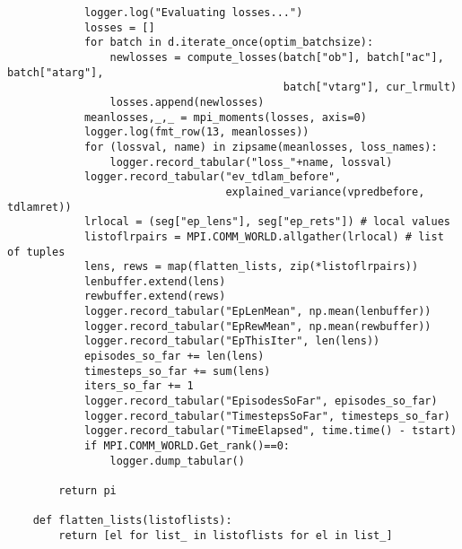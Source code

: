 \begin{verbatim}
            logger.log("Evaluating losses...")
            losses = []
            for batch in d.iterate_once(optim_batchsize):
                newlosses = compute_losses(batch["ob"], batch["ac"], batch["atarg"], 
                                           batch["vtarg"], cur_lrmult)
                losses.append(newlosses)
            meanlosses,_,_ = mpi_moments(losses, axis=0)
            logger.log(fmt_row(13, meanlosses))
            for (lossval, name) in zipsame(meanlosses, loss_names):
                logger.record_tabular("loss_"+name, lossval)
            logger.record_tabular("ev_tdlam_before", 
                                  explained_variance(vpredbefore, tdlamret))
            lrlocal = (seg["ep_lens"], seg["ep_rets"]) # local values
            listoflrpairs = MPI.COMM_WORLD.allgather(lrlocal) # list of tuples
            lens, rews = map(flatten_lists, zip(*listoflrpairs))
            lenbuffer.extend(lens)
            rewbuffer.extend(rews)
            logger.record_tabular("EpLenMean", np.mean(lenbuffer))
            logger.record_tabular("EpRewMean", np.mean(rewbuffer))
            logger.record_tabular("EpThisIter", len(lens))
            episodes_so_far += len(lens)
            timesteps_so_far += sum(lens)
            iters_so_far += 1
            logger.record_tabular("EpisodesSoFar", episodes_so_far)
            logger.record_tabular("TimestepsSoFar", timesteps_so_far)
            logger.record_tabular("TimeElapsed", time.time() - tstart)
            if MPI.COMM_WORLD.Get_rank()==0:
                logger.dump_tabular()

        return pi

    def flatten_lists(listoflists):
        return [el for list_ in listoflists for el in list_]

\end{verbatim}
